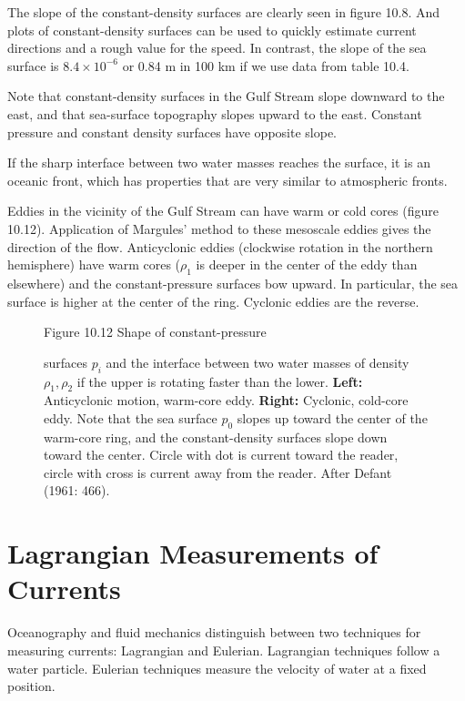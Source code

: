 The slope of the constant-density surfaces are clearly seen in figure 10.8. And
plots of constant-density surfaces can be used to quickly estimate current
directions and a rough value for the speed. In contrast, the slope of the sea
surface is $8.4 \times 10^{-6}$ or 0.84 m in 100 km if we use data from table
10.4. 

Note that constant-density surfaces in the Gulf Stream
slope downward to the east, and that sea-surface topography slopes upward to the east. Constant
pressure and constant density surfaces have opposite slope.

If the sharp interface between two water masses reaches the surface, it is an
oceanic front, which has properties that are very similar to atmospheric
fronts.

Eddies in the vicinity of the Gulf Stream can have warm or cold cores
(figure 10.12). Application of Margules' method to these mesoscale eddies gives the direction of the flow. Anticyclonic eddies (clockwise rotation in the
northern hemisphere) have warm cores ($\rho_1$ is deeper in the center of the eddy than
elsewhere) and the constant-pressure surfaces bow upward. In particular, the sea
surface is higher at the center of the ring. Cyclonic eddies are the reverse.

\begin{figure}[h!]
\vspace{-1ex}
\footnotesize
Figure 10.12 Shape of constant-pressure \rule{0mm}{4ex}surfaces $p_i$ and the
interface between two water masses of density $\rho_1, \rho_2$ if the upper is
rotating faster than the lower.
\textbf{Left:} Anticyclonic motion, warm-core eddy. \textbf{Right:} Cyclonic,
cold-core eddy. Note that the sea surface $p_0$ slopes up toward the center of the
warm-core ring, and the constant-density surfaces slope down toward the center. Circle with
dot is current toward the reader, circle with cross is current away from the reader. After
Defant (1961: 466).
\label{fig:rings}
\vspace{-4ex}
\end{figure}

\section{Lagrangian Measurements of Currents}
Oceanography and fluid mechanics distinguish between
two techniques for measuring currents: Lagrangian and Eulerian. Lagrangian techniques
follow a water particle. Eulerian techniques measure the velocity of water at a fixed
position.


